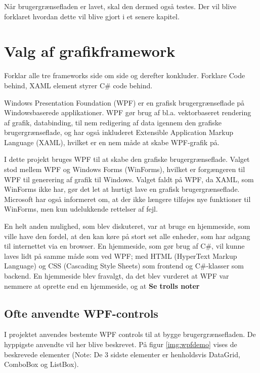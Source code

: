 Når brugergrænsefladen er lavet, skal den dermed også testes. Der vil blive forklaret hvordan dette vil blive gjort i et senere kapitel. 

\section{Valg af grafikframework}

Forklar alle tre frameworks side om side og derefter konkluder. 
Forklare Code behind, XAML element styrer C\# code behind. 

Windows Presentation Foundation (WPF) er en grafisk brugergrænseflade på Windowsbaserede applikationer. 
WPF gør brug af  bl.a. vektorbaseret rendering af grafik, databinding, til nem redigering af data igennem den grafiske brugergrænseflade, og har også inkluderet Extensible Application Markup Language (XAML), hvilket er en nem måde at skabe WPF-grafik på.\citep{wpf} 

I dette projekt bruges WPF til at skabe den grafiske brugergrænseflade. Valget stod mellem WPF og Windows Forms (WinForms), hvilket er forgængeren til WPF til generering af grafik til Windows. 
Valget faldt på WPF, da XAML, som WinForms ikke har, gør det let at hurtigt lave en grafisk brugergrænseflade. 
Microsoft har også informeret om, at der ikke længere tilføjes nye funktioner til WinForms, men kun udelukkende rettelser af fejl.\citep{winforms}

En helt anden mulighed, som blev diskuteret, var at bruge en hjemmeside, som ville have den fordel, at den kan køre på stort set alle enheder, som har adgang til internettet via en browser. En hjemmeside, som gør brug af C\#, vil kunne laves lidt på samme måde som ved WPF; med HTML (HyperText Markup Language) og CSS (Cascading Style Sheets) som frontend og C\#-klasser som backend. 
En hjemmeside blev fravalgt, da det blev vurderet at WPF var nemmere at oprette end en hjemmeside, og at \textbf{Se trolls noter}

\subsection{Ofte anvendte WPF-controls}
I projektet anvendes bestemte WPF controls til at bygge brugergrænsefladen. 
De hyppigste anvendte vil her blive beskrevet. 
På figur \ref{img:wpfdemo} vises de beskrevede elementer (Note: De 3 sidste elementer er henholdsvis DataGrid, ComboBox og ListBox).

